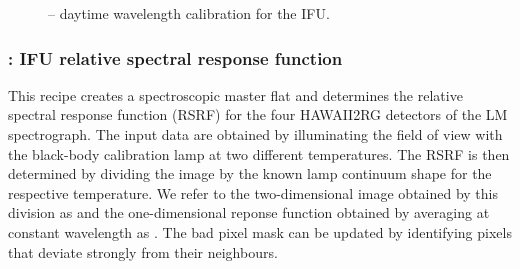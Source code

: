 \begin{figure}[hb]
    \centering
    \def \globalscale {0.700000}
    \fontsize{10}{12}\selectfont
    
  \caption[Recipe: ]{ --
    daytime wavelength calibration for the IFU.}
  \label{fig:metis_ifu_wavecal}
\end{figure}


\clearpage
\subsubsection{: IFU relative spectral response function}
\label{sssec:ifu_rsrf}
\label{rec:metis_ifu_rsrf}

This recipe creates a spectroscopic master flat and determines the
relative spectral response function (RSRF) for the four HAWAII2RG
detectors of the LM spectrograph. The input data are obtained by
illuminating the field of view with the black-body calibration lamp at
two different temperatures. The RSRF is then determined by dividing
the image by the known lamp continuum shape for the respective
temperature. We refer to the two-dimensional image obtained by this
division as \hyperref[dataitem:master_flat_ifu]{} and the one-dimensional reponse
function obtained by averaging at constant wavelength as
\hyperref[dataitem:rsrf_ifu]{}. The bad pixel mask can be updated by identifying pixels
that deviate strongly from their neighbours.

